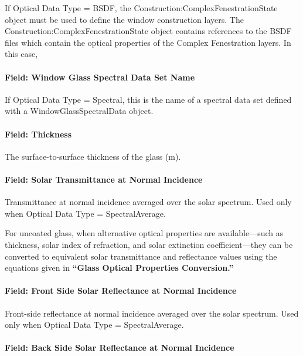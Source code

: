 If Optical Data Type = BSDF, the Construction:ComplexFenestrationState object must be used to define the window construction layers. The Construction:ComplexFenestrationState object contains references to the BSDF files which contain the optical properties of the Complex Fenestration layers. In this case,

\paragraph{Field: Window Glass Spectral Data Set Name}\label{field-window-glass-spectral-data-set-name}

If Optical Data Type = Spectral, this is the name of a spectral data set defined with a WindowGlassSpectralData object.

\paragraph{Field: Thickness}\label{field-thickness-1}

The surface-to-surface thickness of the glass (m).

\paragraph{Field: Solar Transmittance at Normal Incidence}\label{field-solar-transmittance-at-normal-incidence}

Transmittance at normal incidence averaged over the solar spectrum. Used only when Optical Data Type = SpectralAverage.

For uncoated glass, when alternative optical properties are available---such as thickness, solar index of refraction, and solar extinction coefficient---they can be converted to equivalent solar transmittance and reflectance values using the equations given in \textbf{``Glass Optical Properties Conversion.''}

\paragraph{Field: Front Side Solar Reflectance at Normal Incidence}\label{field-front-side-solar-reflectance-at-normal-incidence}

Front-side reflectance at normal incidence averaged over the solar spectrum. Used only when Optical Data Type = SpectralAverage.

\paragraph{Field: Back Side Solar Reflectance at Normal Incidence}\label{field-back-side-solar-reflectance-at-normal-incidence}

